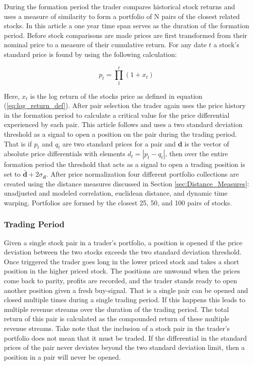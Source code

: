 During the formation period the trader compares historical stock returns and uses a measure of similarity to form a portfolio of N pairs of the closest related stocks. In this article a one year time span serves as the duration of the formation period. Before stock comparisons are made prices are first transformed from their nominal price to a measure of their cumulative return. For any date $t$ a stock's standard price is found by using the following calculation:

\begin{equation} \label{eq:standard_price}
    p_{t} = \prod_{1}^{t} (1 + x_{t})
\end{equation}

Here, $x_{t}$ is the log return of the stocks price as defined in equation (\ref{eq:log_return_def}). After pair selection the trader again uses the price history in the formation period to calculate a critical value for the price differential experienced by each pair. This article follows \cite{Gatev_et_al_2006} and uses a two standard deviation threshold as a signal to open a position on the pair during the trading period. That is if $p_{t}$ and $q_{t}$ are two standard prices for a pair and $\boldsymbol{d}$ is the vector of absolute price differentials with elements $d_{t} = |p_{t} - q_{t}|$, then over the entire formation period the threshold that acts as a signal to open a trading position is set to $\boldsymbol{\bar{d}} + 2 \sigma_{\boldsymbol{d}}$. After price normalization four different portfolio collections are created using the distance measures discussed in Section \ref{sec:Distance_Measures}: unadjusted and modeled correlation, euclidean distance, and dynamic time warping. Portfolios are formed by the closest 25, 50, and 100 pairs of stocks.


\subsubsection{Trading Period}

Given a single stock pair in a trader's portfolio, a position is opened if the price deviation between the two stocks exceeds the two standard deviation threshold. Once triggered the trader goes long in the lower priced stock and takes a short position in the higher priced stock. The positions are unwound when the prices come back to parity, profits are recorded, and the trader stands ready to open another position given a fresh buy-signal. That is a single pair can be opened and closed multiple times during a single trading period. If this happens this leads to multiple revenue streams over the duration of the trading period. The total return of this pair is calculated as the compounded return of these multiple revenue streams. Take note that the inclusion of a stock pair in the trader's portfolio does not mean that it must be traded. If the differential in the standard prices of the pair never deviates beyond the two standard deviation limit, then a position in a pair will never be opened.

